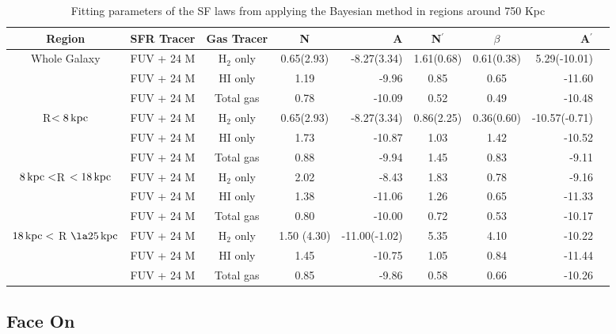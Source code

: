\documentclass[useAMS,usenatbib]{mn2e}
\newcommand \kpc        {\,{\rm kpc}}
\newcommand \nprime {N$^\prime$}
\begin{document}
\begin{table*}
\caption{Fitting parameters of the SF laws from applying the Bayesian method in regions around 750 Kpc}
\label{table:res750}
\begin{tabular}{ccccrccrr}
\hline\hline
\multicolumn{1}{c}{\multirow{1}{*}{Region}} & SFR Tracer        & Gas Tracer & N    & A      & \nprime & $\beta$ & A$^\prime$ \\
\hline
\multicolumn{1}{c}{\multirow{3}{*}{Whole Galaxy}}
 & FUV + 24 M       & H$_2$ only & 0.65(2.93) & -8.27(3.34)  & 1.61(0.68)  & 0.61(0.38) & 5.29(-10.01)   \\
 & FUV + 24 M       & HI only    & 1.19 & -9.96  & 0.85    & 0.65    & -11.60     \\
 & FUV + 24 M       & Total gas  & 0.78 & -10.09 & 0.52    & 0.49    & -10.48     \\
\hline
\multicolumn{1}{c}{\multirow{3}{*}{R$< 8\kpc$}}
 & FUV + 24 M       & H$_2$ only & 0.65(2.93) & -8.27(3.34) & 0.86(2.25)    & 0.36(0.60)    & -10.57(-0.71)      \\
 & FUV + 24 M       & HI only    & 1.73 & -10.87 & 1.03    & 1.42    & -10.52     \\
 & FUV + 24 M       & Total gas  & 0.88 & -9.94 & 1.45    & 0.83    & -9.11      \\
\hline
\multicolumn{1}{c}{\multirow{3}{*}{$8\kpc < $R $< 18\kpc$}}
 & FUV + 24 M       & H$_2$ only & 2.02 & -8.43  &    1.83     &  0.78       &   -9.16         \\
 & FUV + 24 M       & HI only    & 1.38 & -11.06  & 1.26    & 0.65    & -11.33     \\
 & FUV + 24 M       & Total gas  & 0.80 & -10.00 & 0.72    & 0.53    & -10.17     \\
\hline
\multicolumn{1}{c}{\multirow{3}{*}{$18\kpc <$ R $\la 25\kpc$}} 
 & FUV + 24 M       & H$_2$ only & 1.50 (4.30) & -11.00(-1.02)  &  5.35    & 4.10    & -10.22   \\
 & FUV + 24 M       & HI only    & 1.45 & -10.75  & 1.05    & 0.84    & -11.44     \\
 & FUV + 24 M       & Total gas  & 0.85 & -9.86 & 0.58    & 0.66    & -10.26     \\
 \hline
\end{tabular}
\end{table*}


\subsection{Face On}
\end{document}

